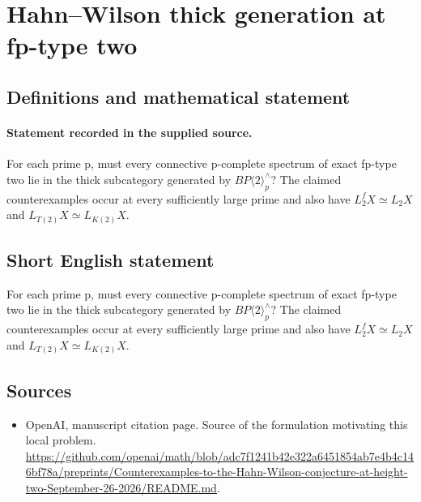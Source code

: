 \documentclass[11pt]{article}
\begin{document}
\section*{Hahn–Wilson thick generation at fp-type two}\label{statement}
\subsection{Definitions and mathematical statement}
\paragraph{Statement recorded in the supplied source.}
For each prime p, must every connective p-complete spectrum of exact fp-type two lie in the thick subcategory generated by $BP\langle 2\rangle _p^\wedge $? The claimed counterexamples occur at every sufficiently large prime and also have $L_{2}^fX\simeq L_{2}X$ and $L_{T(2)}X\simeq L_{K(2)}X$.
\subsection{Short English statement}
For each prime p, must every connective p-complete spectrum of exact fp-type two lie in the thick subcategory generated by $BP\langle 2\rangle _p^\wedge $? The claimed counterexamples occur at every sufficiently large prime and also have $L_{2}^fX\simeq L_{2}X$ and $L_{T(2)}X\simeq L_{K(2)}X$.
\subsection{Sources}
\begin{itemize}
\item[S1] OpenAI, manuscript citation page. Source of the formulation motivating this local problem.
\url{https://github.com/openai/math/blob/adc7f1241b42e322a6451854ab7e4b4c146bf78a/preprints/Counterexamples-to-the-Hahn-Wilson-conjecture-at-height-two-September-26-2026/README.md}.
\end{itemize}
\end{document}
